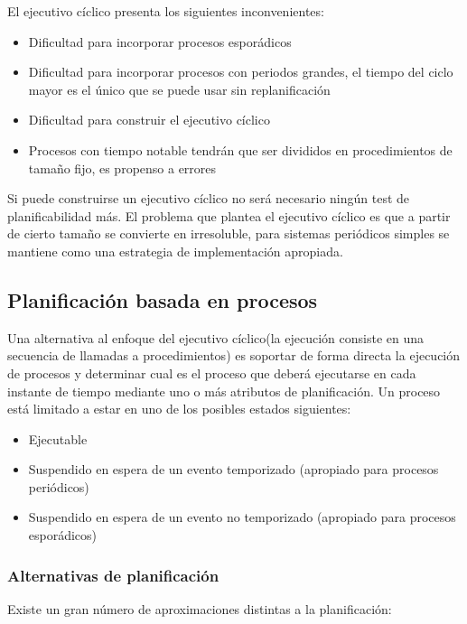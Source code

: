 El ejecutivo cíclico presenta los siguientes inconvenientes:

\begin{itemize}
	\item Dificultad para incorporar procesos esporádicos
	\item Dificultad para incorporar procesos con periodos grandes, el
		tiempo del ciclo mayor es el único que se puede usar sin
		replanificación
	\item Dificultad para construir el ejecutivo cíclico
	\item Procesos con tiempo notable tendrán que ser divididos en
		procedimientos de tamaño fijo, es propenso a errores
\end{itemize}

Si puede construirse un ejecutivo cíclico no será necesario ningún test de
planificabilidad más. El problema que plantea el ejecutivo cíclico es que a
partir de cierto tamaño se convierte en irresoluble, para sistemas periódicos
simples se mantiene como una estrategia de implementación apropiada.

\subsection{Planificación basada en procesos}

Una alternativa al enfoque del ejecutivo cíclico(la ejecución consiste en una
secuencia de llamadas a procedimientos) es soportar de forma directa la
ejecución de procesos y determinar cual es el proceso que deberá ejecutarse en
cada instante de tiempo mediante uno o más atributos de planificación. Un
proceso está limitado a estar en uno de los posibles estados siguientes:

\begin{itemize}
	\item Ejecutable
	\item Suspendido en espera de un evento temporizado (apropiado para
		procesos periódicos)
	\item Suspendido en espera de un evento no temporizado (apropiado para
		procesos esporádicos)
\end{itemize}

\subsubsection{Alternativas de planificación}

Existe un gran número de aproximaciones distintas a la planificación:

